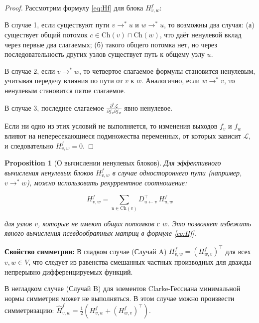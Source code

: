 \documentclass[11pt]{article}
\newtheorem{proposition}{Proposition}
\newcommand{\Ch}{\mathrm{Ch}} %
\begin{document}
\begin{proof}
  Рассмотрим формулу \eqref{eq:Hf} для блока $H^f_{v,w}$:

  В случае 1, если существуют пути $v \rightarrow^* u$ и $w \rightarrow^* u$, то возможны два случая:
  (а) существует общий потомок $c \in \Ch(v) \cap \Ch(w)$, что даёт ненулевой вклад через первые два слагаемых;
  (б) такого общего потомка нет, но через последовательность других узлов существует путь к общему узлу $u$.

  В случае 2, если $v \rightarrow^* w$, то четвертое слагаемое формулы становится ненулевым, учитывая
  передачу влияния по пути от $v$ к $w$. Аналогично, если $w \rightarrow^* v$, то ненулевым становится
  пятое слагаемое.

  В случае 3, последнее слагаемое $\frac{\partial^2 \mathcal{L}}{\partial f_v \partial f_w}$ явно ненулевое.

  Если ни одно из этих условий не выполняется, то изменения выходов $f_v$ и $f_w$ влияют на непересекающиеся
  подмножества переменных, от которых зависит $\mathcal{L}$, и следовательно $H^f_{v,w} = 0$.
\end{proof}

\begin{proposition}[О вычислении ненулевых блоков]
  Для эффективного вычисления ненулевых блоков $H^f_{v,w}$ в случае одностороннего пути (например, $v \rightarrow^* w$),
  можно использовать рекуррентное соотношение:

  \[
    H^f_{v,w} = \sum_{u\in\Ch(v)} D_{u\gets v}^\top\,H^f_{u,w}
  \]

  для узлов $v$, которые не имеют общих потомков с $w$. Это позволяет избежать явного вычисления
  псевдообратных матриц в формуле \eqref{eq:Hf}.
\end{proposition}

\textbf{Свойство симметрии:} В гладком случае (Случай A) $H^f_{v,w}=(H^f_{w,v})^\top$ для всех $v,w \in V$,
что следует из равенства смешанных частных производных для дважды непрерывно дифференцируемых функций.

В негладком случае (Случай B) для элементов Clarke-Гессиана минимальной нормы симметрия может не выполняться.
В этом случае можно произвести симметризацию: $\hat{H}^f_{v,w} = \frac{1}{2}(H^f_{v,w} + (H^f_{w,v})^\top)$.
\end{document}
